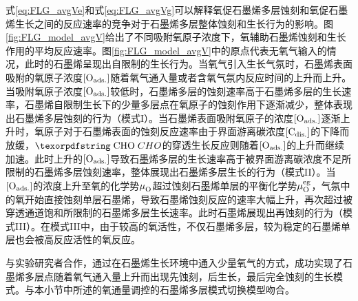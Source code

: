 式\eqref{eq:FLG_avgVe}和式\eqref{eq:FLG_avgVg}可以解释氧促石墨烯多层蚀刻和氧促石墨烯生长之间的反应速率的竞争对于石墨烯多层整体蚀刻和生长行为的影响。图\ref{fig:FLG_model_avgV}给出了不同吸附氧原子浓度下，氧辅助石墨烯蚀刻和生长作用的平均反应速率。图\ref{fig:FLG_model_avgV}中的原点代表无氧气输入的情况，此时的石墨烯呈现出自限制的生长行为。当氧气引入生长气氛时，石墨烯表面吸附的氧原子浓度$\rm{\left[O_{ads.}\right]} \it$随着氧气通入量或者含氧气氛内反应时间的上升而上升。当吸附氧原子浓度$\rm{\left[O_{ads.}\right]} \it$较低时，石墨烯多层的蚀刻速率高于石墨烯多层的生长速率，石墨烯自限制生长下的少量多层点在氧原子的蚀刻作用下逐渐减少，整体表现出石墨烯多层蚀刻的行为（模式I）。当石墨烯表面吸附氧原子的浓度$\rm{\left[O_{ads.}\right]} \it$逐渐上升时，氧原子对于石墨烯表面的蚀刻反应速率由于界面游离碳浓度$\rm{\left[C_{dis.}\right]} \it$的下降而放缓，$\cemb{CHO}$的穿透生长反应则随着$\rm{\left[O_{ads.}\right]} \it$的上升而继续加速。此时上升的$\rm{\left[O_{ads.}\right]} \it$导致石墨烯多层的生长速率高于被界面游离碳浓度不足所限制的石墨烯多层蚀刻速率，整体展现出石墨烯多层生长的行为（模式II）。当$\rm{\left[O_{ads.}\right]} \it$的浓度上升至氧的化学势$\it \mu_{\rm O}^{\rm } \it$超过蚀刻石墨烯单层的平衡化学势$\it \mu_{\rm O}^{\rm eg} \it$，气氛中的氧开始直接蚀刻单层石墨烯，导致石墨烯蚀刻反应的速率大幅上升，再次超过被穿透通道饱和所限制的石墨烯多层生长速率。此时石墨烯展现出再蚀刻的行为（模式III）。在模式III中，由于较高的氧活性，不仅石墨烯多层，较为稳定的石墨烯单层也会被高反应活性的氧反应。

与实验研究者合作，通过在石墨烯生长环境中通入少量氧气的方式，成功实现了石墨烯多层点随着氧气通入量上升而出现先蚀刻，后生长，最后完全蚀刻的生长模式。与本小节中所述的氧通量调控的石墨烯多层模式切换模型吻合。

